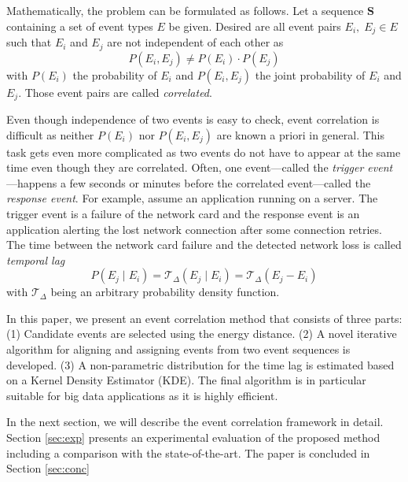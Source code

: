 \documentclass[conference]{IEEEtran}
\theoremstyle{examplestyle}
\begin{document}
Mathematically, the problem can be formulated as follows. Let a sequence \(\pmb{S}\) containing a set of event types \(E\) be given. Desired are all event pairs \(E_i, \; E_j \in E\) such that \(E_i\) and \(E_j\) are not independent of each other as
\begin{equation}
	P(E_i, E_j) \neq P(E_i) \cdot P(E_j)
\end{equation}
with \(P(E_i)\) the probability of \(E_i\) and \(P(E_i, E_j)\) the joint probability of \(E_i\) and \(E_j\). Those event pairs are called \textit{correlated}.

Even though independence of two events is easy to check, event correlation is difficult as neither \(P(E_i)\) nor \(P(E_i, E_j)\) are known a priori in general. This task gets even more complicated as two events do not have to appear at the same time even though they are correlated. Often, one event---called the \textit{trigger event}---happens a few seconds or minutes before the correlated event---called the \textit{response event}. For example, assume an application running on a server. The trigger event is a failure of the network card and the response event is an application alerting the lost network connection after some connection retries. The time between the network card failure and the detected network loss is called \textit{temporal lag}
\begin{equation}
	P(E_j \; | \; E_i) = \mathcal{T}_\Delta (E_j \; | \; E_i) = \mathcal{T}_\Delta (E_j - E_i)
\end{equation}
with \(\mathcal{T}_\Delta\) being an arbitrary probability density function.

In this paper, we present an event correlation method that consists of three parts:
(1) Candidate  events are selected using the energy distance. (2) A novel iterative algorithm for aligning and assigning events from two event sequences is developed. (3) A non-parametric distribution for the time lag is estimated based on a Kernel Density Estimator (KDE).
The final algorithm is in particular suitable for big data applications as it is highly efficient. 

In the next section, we will describe the event correlation framework in detail.
Section \ref{sec:exp} presents an experimental evaluation of the proposed method including a comparison with the state-of-the-art.
The paper is concluded in Section \ref{sec:conc}
\end{document}
